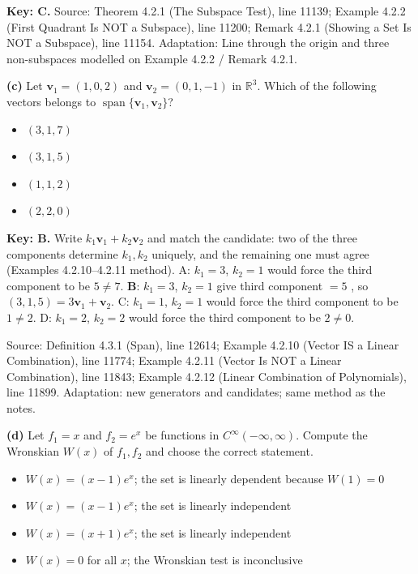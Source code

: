 \documentclass[11pt,a4paper]{article}
\newcommand{\Src}[1]{{\footnotesize\color{black!65}Source: #1}}
\begin{document}
\textbf{Key: C.} \Src{Theorem 4.2.1 (The Subspace Test), line 11139; Example 4.2.2 (First Quadrant Is NOT a Subspace), line 11200; Remark 4.2.1 (Showing a Set Is NOT a Subspace), line 11154. Adaptation: Line through the origin and three non-subspaces modelled on Example 4.2.2 / Remark 4.2.1.}\par
\textbf{(c)} Let $\mathbf{v}_1=(1,0,2)$ and $\mathbf{v}_2=(0,1,-1)$ in $\mathbb{R}^3$. Which of the following vectors belongs to $\operatorname{span}\{\mathbf{v}_1,\mathbf{v}_2\}$?\par
\begin{itemize}[leftmargin=8mm,itemsep=0pt]\item[A] $(3,1,7)$\item[B$^{\ast}$] $(3,1,5)$\item[C] $(1,1,2)$\item[D] $(2,2,0)$\end{itemize}
\textbf{Key: B.} Write $k_1\mathbf{v}_1+k_2\mathbf{v}_2$ and match the candidate: two of the three components determine $k_1,k_2$ uniquely, and the remaining one must agree (Examples 4.2.10--4.2.11 method). A: $k_1=3$, $k_2=1$ would force the third component to be $5\neq7$. \textbf{B}: $k_1=3$, $k_2=1$ give third component $=5$ \checkmark, so $(3,1,5)=3\mathbf{v}_1+\mathbf{v}_2$. C: $k_1=1$, $k_2=1$ would force the third component to be $1\neq2$. D: $k_1=2$, $k_2=2$ would force the third component to be $2\neq0$.\par
\Src{Definition 4.3.1 (Span), line 12614; Example 4.2.10 (Vector IS a Linear Combination), line 11774; Example 4.2.11 (Vector Is NOT a Linear Combination), line 11843; Example 4.2.12 (Linear Combination of Polynomials), line 11899. Adaptation: new generators and candidates; same method as the notes.}\par
\textbf{(d)} Let $f_1=x$ and $f_2=e^{x}$ be functions in $C^{\infty}(-\infty,\infty)$. Compute the Wronskian $W(x)$ of $f_1,f_2$ and choose the correct statement.\par
\begin{itemize}[leftmargin=8mm,itemsep=0pt]\item[A] $W(x)=(x-1)e^{x}$; the set is linearly dependent because $W(1)=0$\item[B$^{\ast}$] $W(x)=(x-1)e^{x}$; the set is linearly independent\item[C] $W(x)=(x+1)e^{x}$; the set is linearly independent\item[D] $W(x)=0$ for all $x$; the Wronskian test is inconclusive\end{itemize}
\end{document}
